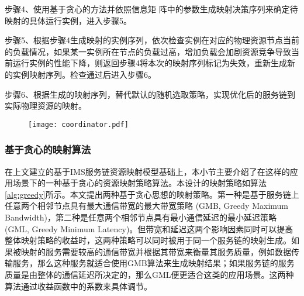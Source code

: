 步骤4、使用基于贪心的方法并依照信息矩 阵中的参数生成映射决策序列来确定待映射的具体运行实例，进入步骤5。

步骤5、根据步骤4生成映射的实例序列，依次检查实例在对应的物理资源节点当前的负载情况，如果某一实例所在节点的负载过高，增加负载会加剧资源竞争导致当前运行实例的性能下降，则返回步骤4将本次的映射序列标记为失效，重新生成新的实例映射序列。检查通过后进入步骤6。

步骤6、根据生成的映射序列，替代默认的随机选取策略，实现优化后的服务链到实际物理资源的映射。


\begin{figure}[!htp]
	\centering
	\texttt{[image: coordinator.pdf]}
\end{figure}\textbf{}

\subsubsection{基于贪心的映射算法}
在上文建立的基于IMS服务链资源映射模型基础上，本小节主要介绍了在这样的应用场景下的一种基于贪心的资源映射策略算法。本设计的映射策略如算法\ref{alg:greedy}所示。本文提出两种基于贪心思想的映射策略。第一种是基于服务链上任意两个相邻节点具有最大通信带宽的最大带宽策略 (GMB, Greedy Maximum Bandwidth)，第二种是任意两个相邻节点具有最小通信延迟的最小延迟策略 (GML, Greedy Minimum Latency)。但带宽和延迟这两个影响因素同时可以提高整体映射策略的收益时，这两种策略可以同时被用于同一个服务链的映射生成。如果被映射的服务需要较高的通信带宽并根据其带宽来衡量其服务质量，例如数据传输服务，那么这种服务就适合使用GMB算法来生成映射结果；如果服务链的服务质量是由整体的通信延迟所决定的，那么GML便更适合这类的应用场景。这两种算法通过收益函数中的系数来具体调节。

